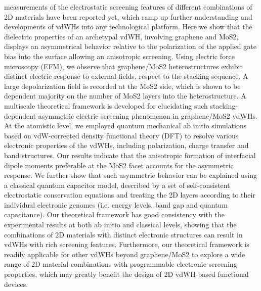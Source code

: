 measurements of the electrostatic screening features of different
combinations of 2D materials have been reported yet, which ramp up
further understanding and developments of vdWHs into any technological
platform.  Here we show that the dielectric properties of an
archetypal vdWH, involving graphene and MoS2, displays an asymmetrical
behavior relative to the polarization of the applied gate bias into
the surface allowing an anisotropic screening. Using electric force
microscopy (EFM), we observe that graphene/MoS2 heterostructures
exhibit distinct electric response to external fields, respect to the
stacking sequence. A large depolarization field is recorded at the
MoS2 side, which is shown to be dependent majority on the number of
MoS2 layers into the heterostructure. A multiscale theoretical
framework is developed for elucidating such stacking-dependent
asymmetric electric screening phenomenon in graphene/MoS2 vdWHs. At
the atomistic level, we employed quantum mechanical ab initio
simulations based on vdW-corrected density functional theory (DFT) to
resolve various electronic properties of the vdWHs, including
polarization, charge transfer and band structures. Our results
indicate that the anisotropic formation of interfacial dipole moments
preferable at the MoS2 facet accounts for the asymmetric response. We
further show that such asymmetric behavior can be explained using a
classical quantum capacitor model, described by a set of
self-consistent electrostatic conservation equations and treating the
2D layers according to their individual electronic genomes
(i.e. energy levels, band gap and quantum capacitance). Our
theoretical framework has good consistency with the experimental
results at both ab initio and classical levels, showing that the
combinations of 2D materials with distinct electronic structures can
result in vdWHs with rich screening features. Furthermore, our
theoretical framework is readily applicable for other vdWHs beyond
graphene/MoS2 to explore a wide range of 2D material combinations with
programmable electronic screening properties, which may greatly
benefit the design of 2D vdWH-based functional devices.

